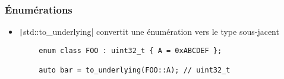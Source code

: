 \documentclass[C++.tex]{subfiles}
\begin{document}
\begin{frame}[fragile]
	\frametitle{Énumérations}
	\begin{itemize}
		\item \texttt|std::to_underlying| convertit une énumération vers le type sous-jacent
	\end{itemize}

	\begin{verbatim}
		enum class FOO : uint32_t { A = 0xABCDEF };

		auto bar = to_underlying(FOO::A); // uint32_t
	\end{verbatim}


\end{frame}
\end{document}
